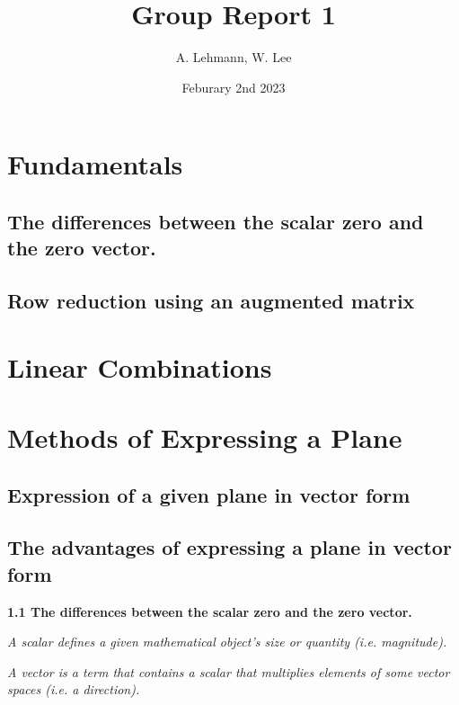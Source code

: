 \documentclass{article}
\title{Group Report 1}
\author{A. Lehmann, W. Lee}
\date{Feburary 2nd 2023}
\begin{document}
	
	\maketitle
	\section{Fundamentals}
	\subsection{The differences between the scalar zero and the zero vector.}
	\subsection{Row reduction using an augmented matrix}
	
	
	\section{Linear Combinations}
	
	\section{Methods of Expressing a Plane}
	\subsection{Expression of a given plane in vector form}
	\subsection{The advantages of expressing a plane in vector form}
	
	
	\clearpage
	
	
	\textbf{1.1 The differences between the scalar zero and the zero vector.}
	
	
	\textit{A scalar defines a given mathematical object's size or quantity (i.e. magnitude).}
	
	\textit{A vector is a term that contains a scalar that multiplies elements of some vector spaces (i.e. a direction).}
	
\end{document}
